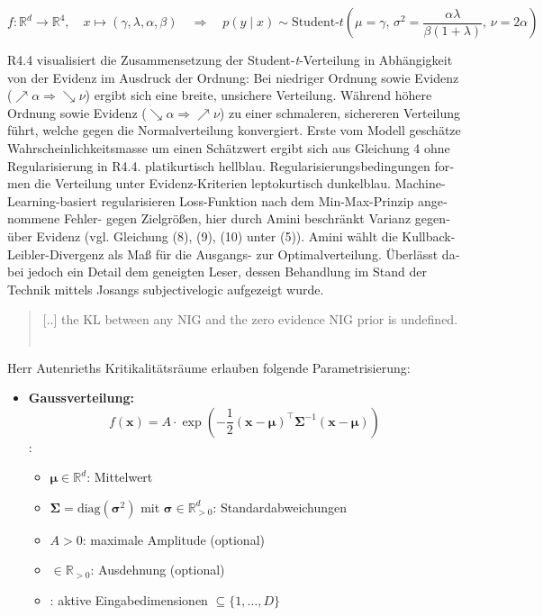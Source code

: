\begin{otherlanguage}{ngerman}
\[
f : \mathbb{R}^d \to \mathbb{R}^4, \quad x \mapsto (\gamma, \lambda, \alpha, \beta) \quad \Rightarrow \quad p(y \mid x) \sim \text{Student-}t\left(\mu = \gamma,\, \sigma^2 = \frac{\alpha \lambda}{\beta (1 + \lambda)},\, \nu = 2\alpha\right)
\]

R4.4 visualisiert die Zusammensetzung der Student-\emph{t}-Verteilung in Abhängigkeit von der Evidenz im Ausdruck der Ordnung: Bei niedriger Ordnung sowie Evidenz (\(\nearrow \alpha \Rightarrow \searrow \nu\)) ergibt sich eine breite, unsichere Verteilung. Während höhere Ordnung sowie Evidenz (\(\searrow \alpha \Rightarrow \nearrow \nu\)) zu einer schmaleren, sichereren Verteilung führt, welche gegen die Normalverteilung konvergiert. Erste vom Modell geschätze Wahrscheinlichkeitsmasse um einen Schätzwert ergibt sich aus Gleichung 4 ohne Regularisierung in R4.4. platikurtisch hellblau. Regularisierungsbedingungen formen die Verteilung unter Evidenz-Kriterien leptokurtisch dunkelblau. Machine-Learning-basiert regularisieren Loss-Funktion nach dem Min-Max-Prinzip angenommene Fehler- gegen Zielgrößen, hier durch Amini beschränkt Varianz gegenüber Evidenz (vgl. Gleichung (8), (9), (10) unter (5)). Amini wählt die Kullback-Leibler-Divergenz als Maß für die Ausgangs- zur Optimalverteilung. Überlässt dabei jedoch ein Detail dem geneigten Leser, dessen Behandlung im Stand der Technik mittels Josangs \gls{subjectivelogic} aufgezeigt wurde.

\begin{quote}
  \glqq{}[..] the KL between any NIG and the zero evidence NIG prior is undefined.\grqq{} \newline ~\parencite[{S. 5, \glqq Minimizing evidence on errors \grqq, Z. 6 ff.}]{amini2020deep}
\end{quote}

Herr Autenrieths Kritikalitätsräume erlauben folgende Parametrisierung: 

\begin{itemize}
  \item \textbf{Gaussverteilung:}
    \[
    f(\mathbf{x}) = A \cdot \exp\left(-\frac{1}{2} (\mathbf{x} - \boldsymbol{\mu})^\top \mathbf{\Sigma}^{-1} (\mathbf{x} - \boldsymbol{\mu}) \right)
    \]
    :
    \begin{itemize}
      \item $\boldsymbol{\mu} \in \mathbb{R}^d$: Mittelwert
      \item $\mathbf{\Sigma} = \mathrm{diag}(\boldsymbol{\sigma}^2)$ mit $\boldsymbol{\sigma} \in \mathbb{R}_{>0}^d$: Standardabweichungen
      \item $A > 0$: maximale Amplitude (optional)
      \item {} $\in \mathbb{R}_{>0}$: Ausdehnung (optional)
      \item {}: aktive Eingabedimensionen $\subseteq \{1, \dots, D\}$
    \end{itemize}


\end{itemize}
\end{otherlanguage}
